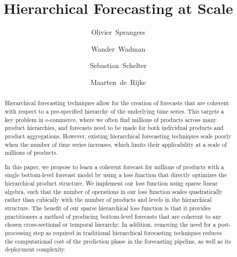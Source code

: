 \documentclass[preprint, 3p, times, twocolumn]{elsarticle}
\begin{document}
\begin{frontmatter}

\title{Hierarchical Forecasting at Scale}

\author[1]{Olivier~Sprangers}
\author[2]{Wander~Wadman}
\author[3]{Sebastian~Schelter}

\author[3]{Maarten~de~Rijke}


\address[1]{AIRLab, University of Amsterdam, Science Park 900, 1098 XH Amsterdam, The Netherlands}
\address[2]{bol.com, Papendorpseweg 100, 3528 BJ Utrecht, The Netherlands}
\address[3]{University of Amsterdam, Science Park 900, 1098 XH Amsterdam, The Netherlands}



\begin{abstract}
  Hierarchical forecasting techniques allow for the creation of forecasts that are coherent with respect to a pre-specified hierarchy of the underlying time series. This targets a key problem in e-commerce, where we often find millions of products across many product hierarchies, and forecasts need to be made for both individual products and product aggregations. However, existing hierarchical forecasting techniques scale poorly when the number of time series increases, which limits their applicability at a scale of millions of products. 
  
  In this paper, we propose to learn a coherent forecast for millions of products with a single bottom-level forecast model by using a loss function that directly optimizes the hierarchical product structure. We implement our loss function using sparse linear algebra, such that the number of operations in our loss function scales quadratically rather than cubically with the number of products and levels in the hierarchical structure. The benefit of our sparse hierarchical loss function is that it provides practitioners a method of producing bottom-level forecasts that are coherent to any chosen cross-sectional or temporal hierarchy. In addition, removing the need for a post-processing step as required in traditional hierarchical forecasting techniques reduces the computational cost of the prediction phase in the forecasting pipeline, as well as its deployment complexity.  
  

\end{abstract}
\end{frontmatter}
\end{document}
